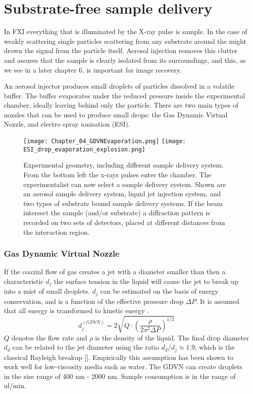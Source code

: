 \chapter{Substrate-free sample delivery}
In FXI everything that is illuminated by the X-ray pulse is sample. In the case of weakly scattering single particles scattering from any substrate around the might drown the signal from the particle itself. Aerosol injection removes this clutter and assures that the sample is clearly isolated from its surroundings, and this, as we see in a later chapter 6, is important for image recovery.

An aerosol injector produces small droplets of particles dissolved in a volatile buffer. The buffer evaporates under the reduced pressure inside the experimental chamber, ideally leaving behind only the particle. There are two main types of nozzles that can be used to produce small drops: the Gas Dynamic Virtual Nozzle, and electro spray ionisation (ESI).

\begin{figure}[h]\label{fig:drop_formation}
\centering 
\texttt{[image: Chapter\_04\_GDVNEvaporation.png]}
\texttt{[image: ESI\_drop\_evaporation\_explosion.png]}

\caption{Experimental geometry, including different sample delivery system. From the bottom left the x-rays pulses enter the chamber. The experimentalist can now select a sample delivery system. Shown are an aerosol sample delivery system, liquid jet injection system, and two types of substrate bound sample delivery systems. If the beam intersect the sample (and/or substrate) a diffraction pattern is recorded on two sets of detectors, placed at different distances from the interaction region.}
\end{figure}




\subsection{Gas Dynamic Virtual Nozzle}

If the coaxial flow of gas creates a jet with a diameter smaller than then a characteristic $d_j$ the surface tension in the liquid will cause the jet to break up into a mist of small droplets. $d_j$ can be estimated on the basis of energy conservation, and is a function of the effective pressure drop $\Delta P$. It is assumed that all energy is transformed to kinetic energy \cite{Acero2013}.
\begin{equation}
d_j^{(GDVN)} = 2 \sqrt{Q \cdot \left(\frac{\rho}{2 \pi^2 \Delta P}\right)^{1/2}}
\end{equation}    
$Q$ denotes the flow rate and $\rho$ is the density of the liquid. The final drop diameter $d_d$ can be related to the jet diameter using the ratio $d_d / d_j \approx 1.9$, which is the classical Rayleigh breakup []. Empirically this assumption has been shown to work well for low-viscosity media such as water. The GDVN can create droplets in the size range of 400 nm - 2000 nm. Sample consumption is in the range of ul/min.

